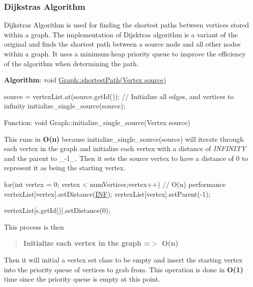 \subsubsection*{Dijkstra\textquotesingle{}s Algorithm}





Dijkstra\textquotesingle{}s Algorithm is used for finding the shortest paths between vertices stored within a graph. The implementation of Dijsktra\textquotesingle{}s algorithm is a variant of the original and finds the shortest path between a source node and all other nodes within a graph. It uses a minimum-\/heap priority queue to improve the efficiency of the algorithm when determining the path.

{\bfseries Algorithm}\+: void \hyperlink{class_graph_a3eb1eaf4a580710194c014d0e135c7b6}{Graph\+::shortest\+Path(\+Vertex source)}


\begin{DoxyCode}
source = vertexList.at(source.getId());
\textcolor{comment}{// Initialize all edges, and vertices to infinity}
initialize\_single\_source(source);
\end{DoxyCode}


Function\+: void Graph\+::initialize\+\_\+single\+\_\+source(\+Vertex source)

This runs in {\bfseries O(n)} because {\ttfamily initialize\+\_\+single\+\_\+source(source)} will iterate through each vertex in the graph and initialize each vertex with a distance of {\itshape I\+N\+F\+I\+N\+I\+TY} and the parent to \+\_\+-\/1\+\_\+. Then it sets the source vertex to have a distance of 0 to represent it as being the starting vertex.


\begin{DoxyCode}
\textcolor{keywordflow}{for}(\textcolor{keywordtype}{int} vertex = 0; vertex < numVertices;vertex++)  \textcolor{comment}{// O(n) performance}
    vertexList[vertex].setDistance(\hyperlink{vertex_8h_a12c2040f25d8e3a7b9e1c2024c618cb6}{INF});
    vertexList[vertex].setParent(-1);

vertexList[s.getId()].setDistance(0);
\end{DoxyCode}
 This process is then

\begin{quote}
{\bfseries Initialize each vertex in the graph =$>$ O(n)} \end{quote}


Then it will initial a vertex set class to be empty and insert the starting vertex into the priority queue of vertices to grab from. This operation is done in {\bfseries O(1)} time since the priority queue is empty at this point.



